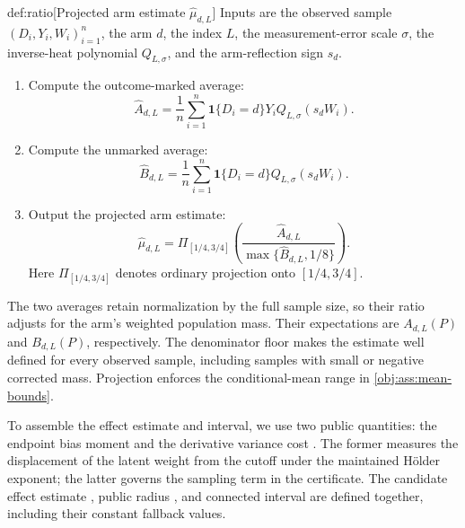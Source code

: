 \begin{algorithmv}{def:ratio}[Projected arm estimate $\widehat\mu_{d,L}$]
Inputs are the observed sample \((D_i,Y_i,W_i)_{i=1}^n\), the arm \(d\), the index \(L\), the measurement-error scale \(\sigma\), the inverse-heat polynomial \(Q_{L,\sigma}\), and the arm-reflection sign \(s_d\).
\begin{enumerate}
\item Compute the outcome-marked average:
\[
\widehat A_{d,L}
=
\frac1n\sum_{i=1}^n
\mathbf1\{D_i=d\}Y_iQ_{L,\sigma}(s_dW_i).
\]
\item Compute the unmarked average:
\[
\widehat B_{d,L}
=
\frac1n\sum_{i=1}^n
\mathbf1\{D_i=d\}Q_{L,\sigma}(s_dW_i).
\]
\item Output the projected arm estimate:
\[
\widehat\mu_{d,L}
=
\Pi_{[1/4,3/4]}
\left(
\frac{\widehat A_{d,L}}
{\max\{\widehat B_{d,L},1/8\}}
\right).
\]
Here \(\Pi_{[1/4,3/4]}\) denotes ordinary projection onto \([1/4,3/4]\).
\end{enumerate}
\end{algorithmv}

The two averages retain normalization by the full sample size, so their ratio adjusts for the arm's weighted population mass. Their expectations are \(A_{d,L}(P)\) and \(B_{d,L}(P)\), respectively. The denominator floor makes the estimate well defined for every observed sample, including samples with small or negative corrected mass. Projection enforces the conditional-mean range in \cref{obj:ass:mean-bounds}.

To assemble the effect estimate and interval, we use two public quantities: the endpoint bias moment  and the derivative variance cost . The former measures the displacement of the latent weight from the cutoff under the maintained Hölder exponent; the latter governs the sampling term in the certificate. The candidate effect estimate , public radius , and connected interval  are defined together, including their constant fallback values.

